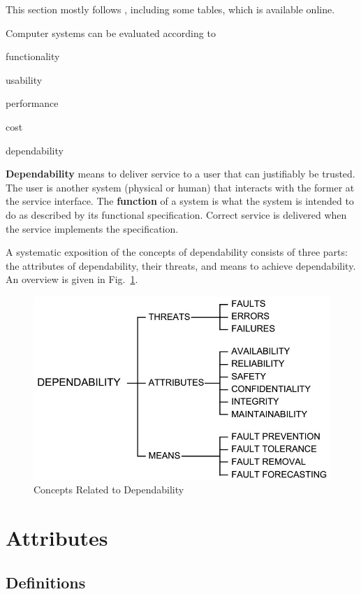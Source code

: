 This section mostly follows \cite{dependability}, including some tables, which is available online.

Computer systems can be evaluated according to
\begin{compactitem}
 \item functionality
 \item usability
 \item performance
 \item cost
 \item dependability
\end{compactitem}

\textbf{Dependability} means to deliver service to a user that can justifiably be trusted.
The user is another system (physical or human) that interacts with the former at the service interface.
The \textbf{function} of a system is what the system is intended to do as described by its functional specification.
Correct service is delivered when the service implements the specification.

A systematic exposition of the concepts of dependability consists of three parts: the attributes of dependability, their threats, and means to achieve dependability.
An overview is given in Fig.~\ref{fig:concepts_dep}.

\begin{figure}
\centering
\includegraphics[width=0.7\linewidth]{concepts_dep}
\caption{Concepts Related to Dependability}
\label{fig:concepts_dep}
\end{figure}

\section{Attributes}

\subsection{Definitions}

